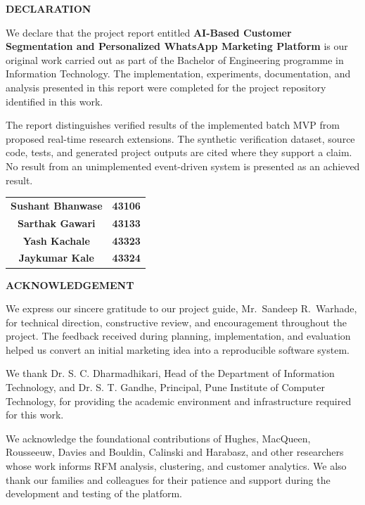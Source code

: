 \documentclass[12pt,a4paper]{report}
\newcommand{\projecttitle}{AI-Based Customer Segmentation and Personalized WhatsApp Marketing Platform}
\newcommand{\guidename}{Mr.~Sandeep R.~Warhade}
\begin{document}
\newpage
\thispagestyle{plain}
\begin{center}\textbf{\LARGE DECLARATION}\end{center}
We declare that the project report entitled \textbf{\projecttitle} is our original work carried out as part of the Bachelor of Engineering programme in Information Technology. The implementation, experiments, documentation, and analysis presented in this report were completed for the project repository identified in this work.

The report distinguishes verified results of the implemented batch MVP from proposed real-time research extensions. The synthetic verification dataset, source code, tests, and generated project outputs are cited where they support a claim. No result from an unimplemented event-driven system is presented as an achieved result.

\vspace{0.7in}
\begin{flushright}
\begin{tabular}{c c}
\textbf{Sushant Bhanwase} & \textbf{43106}\\[12pt]
\textbf{Sarthak Gawari} & \textbf{43133}\\[12pt]
\textbf{Yash Kachale} & \textbf{43323}\\[12pt]
\textbf{Jaykumar Kale} & \textbf{43324}
\end{tabular}
\end{flushright}

\newpage
\thispagestyle{plain}
\begin{center}\textbf{\LARGE ACKNOWLEDGEMENT}\end{center}
We express our sincere gratitude to our project guide, \guidename, for technical direction, constructive review, and encouragement throughout the project. The feedback received during planning, implementation, and evaluation helped us convert an initial marketing idea into a reproducible software system.

We thank Dr. S. C. Dharmadhikari, Head of the Department of Information Technology, and Dr. S. T. Gandhe, Principal, Pune Institute of Computer Technology, for providing the academic environment and infrastructure required for this work.

We acknowledge the foundational contributions of Hughes, MacQueen, Rousseeuw, Davies and Bouldin, Calinski and Harabasz, and other researchers whose work informs RFM analysis, clustering, and customer analytics. We also thank our families and colleagues for their patience and support during the development and testing of the platform.
\end{document}
